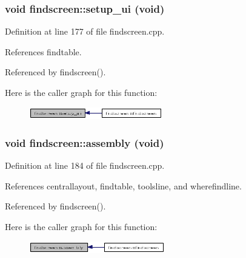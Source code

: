 \subsubsection{\setlength{\rightskip}{0pt plus 5cm}void findscreen::setup\_\-ui (void)\hspace{0.3cm}{\tt  [private]}}\label{classfindscreen_b8d98fa703f0a8eb08a77b197b2a0d4f}




Definition at line 177 of file findscreen.cpp.

References findtable.

Referenced by findscreen().

Here is the caller graph for this function:\begin{figure}[H]
\begin{center}
\leavevmode
\includegraphics[width=165pt]{classfindscreen_b8d98fa703f0a8eb08a77b197b2a0d4f_icgraph}
\end{center}
\end{figure}
\subsubsection{\setlength{\rightskip}{0pt plus 5cm}void findscreen::assembly (void)\hspace{0.3cm}{\tt  [private]}}\label{classfindscreen_f8df2e8eb659306b1395d499e2e2595e}




Definition at line 184 of file findscreen.cpp.

References centrallayout, findtable, toolsline, and wherefindline.

Referenced by findscreen().

Here is the caller graph for this function:\begin{figure}[H]
\begin{center}
\leavevmode
\includegraphics[width=168pt]{classfindscreen_f8df2e8eb659306b1395d499e2e2595e_icgraph}
\end{center}
\end{figure}
